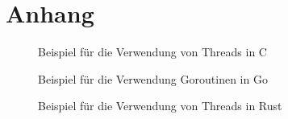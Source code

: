 \section*{Anhang}

\anhangsverzeichnis

\label{anhang:vollstaendiger_quelltext}

\begin{figure}[htp]
    \centering
    
    \caption{Beispiel für die Verwendung von Threads in C}
    \label{ang:parallelitaet_in_c}
\end{figure}

\begin{figure}[htp]
    \centering
    
    \caption{Beispiel für die Verwendung Goroutinen in Go}
    \label{ang:parallelitaet_in_go}
\end{figure}

\begin{figure}[htp]
    \centering
    
    \caption{Beispiel für die Verwendung von Threads in Rust}
    \label{ang:parallelitaet_in_rust}
\end{figure}
